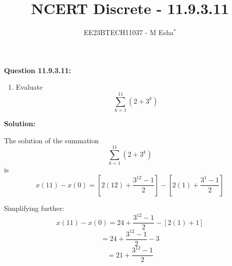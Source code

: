 \documentclass[journal,12pt,twocolumn]{IEEEtran}
\theoremstyle{remark}
\begin{document}

\vspace{3cm}

\title{NCERT Discrete - 11.9.3.11}
\author{EE23BTECH11037 - M Esha$^{*}$}

\maketitle
\newpage
\bigskip

\renewcommand{\thefigure}{\theenumi}
\renewcommand{\thetable}{\theenumi}

\vspace{3cm}
\textbf{Question 11.9.3.11:} 
\begin{enumerate}
\item Evaluate 
\[
\sum_{k=1}^{11} (2 + 3^k)
\]
\end{enumerate}

\textbf{Solution: }

The solution of the summation
\[
\sum_{k=1}^{11} (2 + 3^k)
\]
is
\[
x(11) - x(0) = \left[2(12) + \frac{3^{12} - 1}{2}\right] - \left[2(1) + \frac{3^{1} - 1}{2}\right]
\]

Simplifying further:
\[
x(11) - x(0) = 24 + \frac{3^{12} - 1}{2} - \left[2(1) + 1\right]
\]
\[
= 24 + \frac{3^{12} - 1}{2} - 3
\]
\[
= 21+ \frac{3^{12} - 1}{2}
\]
\end{document}
